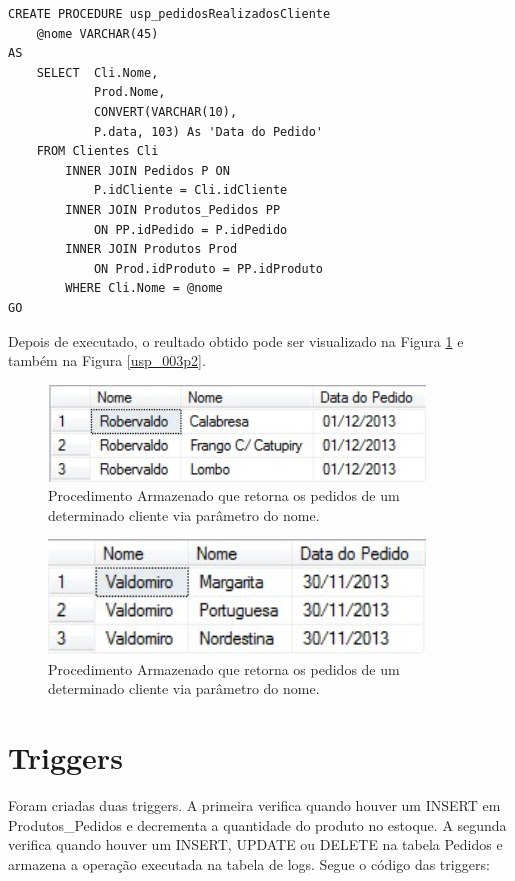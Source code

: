\documentclass[
	12pt,				%
	openright,			%
	oneside,			%
	a4paper,			%
	chapter=TITLE,		%
	section=TITLE,		%
	english,			%
	brazil				%
	]{abntex2}
\begin{document}
    \newpage
    
    \begin{lstlisting}
CREATE PROCEDURE usp_pedidosRealizadosCliente
	@nome VARCHAR(45)
AS
	SELECT  Cli.Nome, 
	        Prod.Nome, 
	        CONVERT(VARCHAR(10), 
	        P.data, 103) As 'Data do Pedido'  
    FROM Clientes Cli
        INNER JOIN Pedidos P ON 
            P.idCliente = Cli.idCliente
        INNER JOIN Produtos_Pedidos PP 
            ON PP.idPedido = P.idPedido
        INNER JOIN Produtos Prod 
            ON Prod.idProduto = PP.idProduto
        WHERE Cli.Nome = @nome     
GO
    \end{lstlisting}
    
    Depois de executado, o reultado obtido pode ser visualizado na Figura \ref{usp_003p1} e 
    também na Figura \ref{usp_003p2}.
    \begin{figure}[h]
         \centering
         \includegraphics[width=10cm,keepaspectratio]{Imgs/USP_003p1}
         \caption{Procedimento Armazenado que retorna os pedidos de um determinado cliente via parâmetro do nome.}
         \label{usp_003p1}
    \end{figure}
    
    \begin{figure}[h]
         \centering
         \includegraphics[width=10cm,keepaspectratio]{Imgs/USP_003p2}
         \caption{Procedimento Armazenado que retorna os pedidos de um determinado cliente via parâmetro do nome.}
         \label{ups_003p2}
    \end{figure}
    
\section {Triggers}
Foram criadas duas triggers. A primeira verifica quando houver um INSERT em Produtos\_Pedidos e decrementa a quantidade 
do produto no estoque. A segunda verifica quando houver um INSERT, UPDATE ou DELETE na tabela Pedidos e armazena a 
operação executada na tabela de logs.
Segue o código das triggers:

\end{document}
